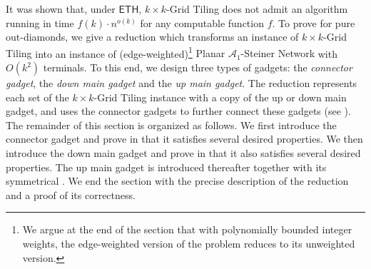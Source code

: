 \documentclass[a4paper,11pt]{article}
\theoremstyle{plain}
\newtheorem{identification rule}{Identification Rule}
\theoremstyle{definition}
\theoremstyle{remark}
\newcommand{\oldC}{\mathcal{A}}
\begin{document}
It was shown \cite[Theorem 14.28]{10.5555/2815661} that, under $\mathsf{ETH}$, {\sc $k \times k$-Grid Tiling} does not admit an algorithm running in time $f(k)\cdot n^{o(k)}$ for any computable function $f$. 
To prove  for pure out-diamonds, 
we give a reduction which transforms an instance of {\sc $k \times k$-Grid Tiling} 
into an instance of (edge-weighted)\footnote{We argue at the end of the section that with polynomially bounded integer weights, the edge-weighted version of the problem reduces to its unweighted version.} {\sc Planar $\oldC_1$-Steiner Network} with $O(k^2)$ terminals.
To this end, we design three types of gadgets: 
the \emph{connector gadget}, the \emph{down main gadget} and the \emph{up main gadget}.
The reduction represents each set of the {\sc $k \times k$-Grid Tiling} instance with a copy of the up or down main gadget,
and uses the connector gadgets to further connect these gadgets (see ).
The remainder of this section is organized as follows.
We first introduce the connector gadget and prove in  that it satisfies several desired properties.
We then introduce the down main gadget and prove in  that it also satisfies several desired properties.
The up main gadget is introduced thereafter together with its symmetrical .
We end the section with the precise description of the reduction and a proof of its correctness.\\
\end{document}
